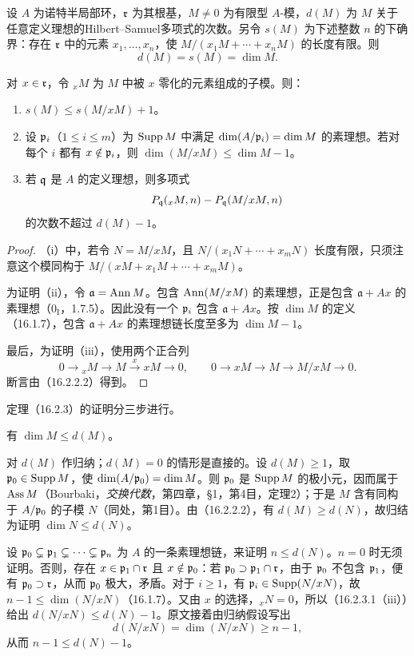 设 $A$ 为诺特半局部环，$\mathfrak r$ 为其根基，$M\ne0$ 为有限型 $A$-模，$d(M)$ 为 $M$ 关于任意定义理想的Hilbert--Samuel多项式的次数。另令 $s(M)$ 为下述整数 $n$ 的下确界：存在 $\mathfrak r$ 中的元素 $x_1,\ldots,x_n$，使
$M/(x_1M+\cdots+x_nM)$ 的长度有限。则
\[
 d(M)=s(M)=\dim M.
\]

对 $x\in\mathfrak r$，令 ${}_xM$ 为 $M$ 中被 $x$ 零化的元素组成的子模。则：
\begin{enumerate}[label=(\roman*)]
 \item $s(M)\leq s(M/xM)+1$。
 \item 设 $\mathfrak p_i$（$1\leq i\leq m$）为 $\operatorname{Supp} M$ 中满足 $\dim(A/\mathfrak p_i)=\dim M$ 的素理想。若对每个 $i$ 都有 $x\notin\mathfrak p_i$，则
 $\dim(M/xM)\leq\dim M-1$。
 \item 若 $\mathfrak q$ 是 $A$ 的定义理想，则多项式
 \[
   P_{\mathfrak q}({}_xM,n)-P_{\mathfrak q}(M/xM,n)
 \]
 的次数不超过 $d(M)-1$。
\end{enumerate}
\begin{proof}
（i）中，若令 $N=M/xM$，且 $N/(x_1N+\cdots+x_mN)$ 长度有限，只须注意这个模同构于 $M/(xM+x_1M+\cdots+x_mM)$。

为证明（ii），令 $\mathfrak a=\operatorname{Ann} M$。包含 $\operatorname{Ann}(M/xM)$ 的素理想，正是包含 $\mathfrak a+Ax$ 的素理想（$0_{\mathrm I}$，1.7.5）。因此没有一个 $\mathfrak p_i$ 包含 $\mathfrak a+Ax$。按 $\dim M$ 的定义（16.1.7），包含 $\mathfrak a+Ax$ 的素理想链长度至多为 $\dim M-1$。

最后，为证明（iii），使用两个正合列
\[
 0\longrightarrow{}_xM\longrightarrow M\xrightarrow{x}xM\longrightarrow0,
 \qquad
 0\longrightarrow xM\longrightarrow M\longrightarrow M/xM\longrightarrow0.
\]
断言由（16.2.2.2）得到。
\end{proof}
定理（16.2.3）的证明分三步进行。

有 $\dim M\leq d(M)$。

对 $d(M)$ 作归纳；$d(M)=0$ 的情形是直接的。设 $d(M)\geq1$，取 $\mathfrak p_0\in\operatorname{Supp} M$，使 $\dim(A/\mathfrak p_0)=\dim M$。则 $\mathfrak p_0$ 是 $\operatorname{Supp} M$ 的极小元，因而属于 $\operatorname{Ass} M$（Bourbaki，\textit{交换代数}，第四章，§1，第4目，定理2）；于是 $M$ 含有同构于 $A/\mathfrak p_0$ 的子模 $N$（同处，第1目）。由（16.2.2.2），有 $d(M)\geq d(N)$，故归结为证明 $\dim N\leq d(N)$。

设 $\mathfrak p_0\subsetneq\mathfrak p_1\subsetneq\cdots\subsetneq\mathfrak p_n$ 为 $A$ 的一条素理想链，来证明 $n\leq d(N)$。$n=0$ 时无须证明。否则，存在
$x\in\mathfrak p_1\cap\mathfrak r$ 且 $x\notin\mathfrak p_0$：若 $\mathfrak p_0\supset\mathfrak p_1\cap\mathfrak r$，由于 $\mathfrak p_0$ 不包含 $\mathfrak p_1$，便有 $\mathfrak p_0\supset\mathfrak r$，从而 $\mathfrak p_0$ 极大，矛盾。对于 $i\geq1$，有 $\mathfrak p_i\in\operatorname{Supp}(N/xN)$，故 $n-1\leq\dim(N/xN)$（16.1.7）。又由 $x$ 的选择，${}_xN=0$，所以（16.2.3.1（iii））给出 $d(N/xN)\leq d(N)-1$。原文接着由归纳假设写出
\[
 d(N/xN)=\dim(N/xN)\geq n-1,
\]
从而 $n-1\leq d(N)-1$。

